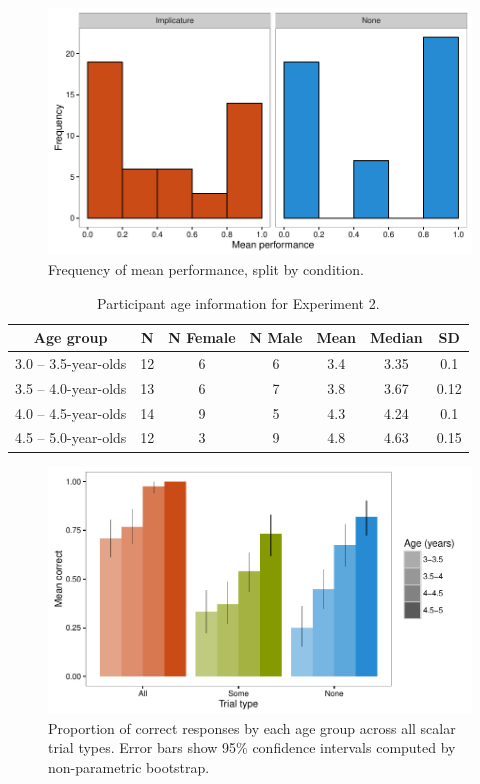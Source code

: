 \documentclass[man]{apa2}
\begin{document}
{\begin{figure}
 \begin{center}
  \includegraphics[width=6in]{figures/exp1_hist.pdf}
  \caption{\label{fig:imp_hist} Frequency of mean performance, split by condition.}
 \end{center}
\end{figure}

\begin{table}[tb]
\centering
\begin{tabular}{ccccccc}
\hline
{\bf Age group} & {\bf N} & {\bf N Female} & {\bf N Male} & {\bf Mean} & {\bf Median} & {\bf SD} \\
\hline
3.0 -- 3.5-year-olds & 12 & 6 & 6 & 3.4 & 3.35 & 0.1\\
3.5 -- 4.0-year-olds & 13 & 6 & 7 & 3.8 & 3.67 & 0.12\\
4.0 -- 4.5-year-olds & 14 & 9 & 5 & 4.3 & 4.24 & 0.1\\
4.5 -- 5.0-year-olds & 12 & 3 & 9 & 4.8 & 4.63 & 0.15\\
\hline
\end{tabular}
\caption{\label{tab:exp_2_demo}Participant age information for Experiment 2.}
\end{table}

\begin{figure}
 \begin{center}
  \includegraphics[width=6in]{figures/exp2_performance.pdf}
  \caption{\label{fig:exp2_perf} Proportion of correct responses by each age group across all scalar trial types. Error bars show 95\% confidence intervals computed by non-parametric bootstrap.}
 \end{center}
\end{figure}

}
\end{document}

